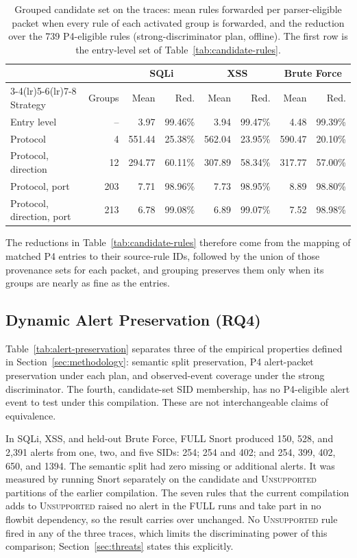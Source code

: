 \documentclass{article}
\begin{document}
\begin{table}[t]
\centering
\caption{Grouped candidate set on the traces: mean rules forwarded per
parser-eligible packet when every rule of each activated group is forwarded,
and the reduction over the 739 P4-eligible rules (strong-discriminator
plan, offline). The first row is the entry-level set of
Table~\ref{tab:candidate-rules}.}
\label{tab:grouped}
\footnotesize
\setlength{\tabcolsep}{3.5pt}
\begin{tabular}{lrrrrrrr}
\toprule
 & & \multicolumn{2}{c}{SQLi} & \multicolumn{2}{c}{XSS} & \multicolumn{2}{c}{Brute Force} \\
\cmidrule(lr){3-4}\cmidrule(lr){5-6}\cmidrule(lr){7-8}
Strategy & Groups & Mean & Red. & Mean & Red. & Mean & Red. \\
\midrule
Entry level & -- & 3.97 & 99.46\% & 3.94 & 99.47\% & 4.48 & 99.39\% \\
Protocol & 4 & 551.44 & 25.38\% & 562.04 & 23.95\% & 590.47 & 20.10\% \\
Protocol, direction & 12 & 294.77 & 60.11\% & 307.89 & 58.34\% & 317.77 & 57.00\% \\
Protocol, port & 203 & 7.71 & 98.96\% & 7.73 & 98.95\% & 8.89 & 98.80\% \\
Protocol, direction, port & 213 & 6.78 & 99.08\% & 6.89 & 99.07\% & 7.52 & 98.98\% \\
\bottomrule
\end{tabular}
\end{table}

The reductions in Table~\ref{tab:candidate-rules} therefore come from the
mapping of matched P4 entries to their source-rule IDs, followed by the
union of those provenance sets for each packet, and grouping preserves them
only when its groups are nearly as fine as the entries.

\subsection{Dynamic Alert Preservation (RQ4)}
Table~\ref{tab:alert-preservation} separates three of the empirical
properties defined in Section~\ref{sec:methodology}: semantic split
preservation, P4 alert-packet preservation under each plan, and
observed-event coverage under the strong discriminator. The fourth,
candidate-set SID membership, has no P4-eligible alert event to test under
this compilation. These are not interchangeable claims of equivalence.

In SQLi, XSS, and held-out Brute Force, FULL Snort produced 150, 528, and
2,391 alerts from one, two, and five SIDs: 254; 254 and 402; and 254, 399,
402, 650, and 1394. The semantic split had zero missing or additional
alerts. It was measured by running Snort separately on the candidate and
\textsc{Unsupported} partitions of the earlier compilation. The seven rules
that the current compilation adds to \textsc{Unsupported} raised no alert in
the FULL runs and take part in no flowbit dependency, so the result carries
over unchanged. No \textsc{Unsupported} rule fired in any of the three
traces, which limits the discriminating power of this comparison;
Section~\ref{sec:threats} states this explicitly.
\end{document}
